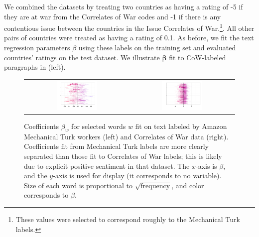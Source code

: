 We combined the datasets by treating two countries as having a
rating of -5 if they are at war from the Correlates of War codes and
-1 if there is any contentious issue between the countries in the
Issue Correlates of War.\footnote{These values were selected to
  correspond roughly to the Mechanical Turk labels.}.  All other pairs
of countries were treated as having a rating of 0.1.  As before, we
fit the text regression parameters $\beta$ using these labels on the
training set and evaluated countries' ratings on the test dataset. We
illustrate $\bm \beta$ fit to CoW-labeled paragraphs in
 (left).

\begin{figure}
  \begin{tabular}{cc}
    \includegraphics[width=0.4\textwidth]{chapter_foreign_relations/figures/mturk_sample_words.pdf} &
    \includegraphics[width=0.4\textwidth]{chapter_foreign_relations/figures/cow_sample_words.pdf} \\
    \end{tabular}
  \caption{Coefficients $\beta_w$ for selected words $w$ fit on text
    labeled by Amazon Mechanical Turk workers (left) and Correlates of
    War data (right). Coefficients fit from Mechanical Turk labels are
    more clearly separated than those fit to Correlates of War labels;
    this is likely due to explicit positive sentiment in that dataset.
    The $x$-axis is $\beta$, and the $y$-axis is used for display (it
    corresponds to no variable).  Size of each word is proportional to
    $\sqrt{\mbox{frequency}}$, and color corresponds to $\beta$.}
  \label{fig:fr_example_betas}
\end{figure}

